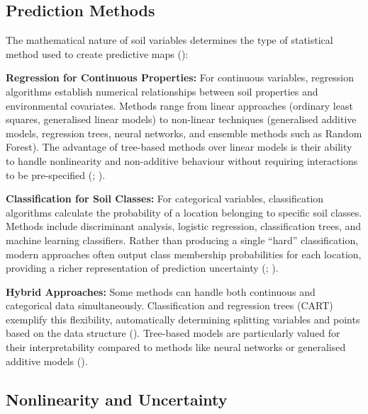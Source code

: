 \documentclass[
  10pt,
  b5paper,
  oneside]{book}
\begin{document}
\subsection{Prediction Methods}\label{prediction-methods}

The mathematical nature of soil variables determines the type of statistical method used to create predictive maps ():

\textbf{Regression for Continuous Properties:} For continuous variables, regression algorithms establish numerical relationships between soil properties and environmental covariates. Methods range from linear approaches (ordinary least squares, generalised linear models) to non-linear techniques (generalised additive models, regression trees, neural networks, and ensemble methods such as Random Forest). The advantage of tree-based methods over linear models is their ability to handle nonlinearity and non-additive behaviour without requiring interactions to be pre-specified (; ).

\textbf{Classification for Soil Classes:} For categorical variables, classification algorithms calculate the probability of a location belonging to specific soil classes. Methods include discriminant analysis, logistic regression, classification trees, and machine learning classifiers. Rather than producing a single ``hard'' classification, modern approaches often output class membership probabilities for each location, providing a richer representation of prediction uncertainty (; ).

\textbf{Hybrid Approaches:} Some methods can handle both continuous and categorical data simultaneously. Classification and regression trees (CART) exemplify this flexibility, automatically determining splitting variables and points based on the data structure (). Tree-based models are particularly valued for their interpretability compared to methods like neural networks or generalised additive models ().

\subsection{Nonlinearity and Uncertainty}\label{nonlinearity-and-uncertainty}
\end{document}
